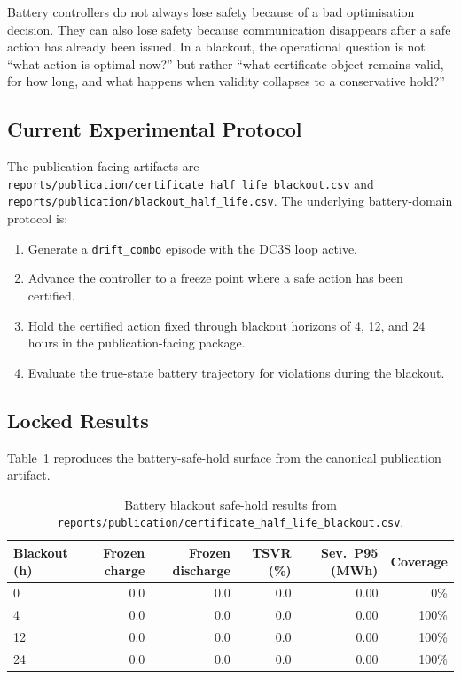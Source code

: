 Battery controllers do not always lose safety because of a bad optimisation
decision.  They can also lose safety because communication disappears after a
safe action has already been issued.  In a blackout, the operational question
is not ``what action is optimal now?'' but rather ``what certificate object
remains valid, for how long, and what happens when validity collapses to a
conservative hold?''

\subsection{Current Experimental Protocol}

The publication-facing artifacts are
\texttt{reports/publication/certificate\_half\_life\_blackout.csv} and
\texttt{reports/publication/blackout\_half\_life.csv}.  The underlying
battery-domain protocol is:

\begin{enumerate}
  \item Generate a \texttt{drift\_combo} episode with the DC3S loop active.
  \item Advance the controller to a freeze point where a safe action has been
    certified.
  \item Hold the certified action fixed through blackout horizons of
    4, 12, and 24 hours in the publication-facing package.
  \item Evaluate the true-state battery trajectory for violations during the
    blackout.
\end{enumerate}

\subsection{Locked Results}

Table~\ref{tab:blackout-study} reproduces the battery-safe-hold surface from
the canonical publication artifact.

\begin{table}[ht]
\centering
\caption{Battery blackout safe-hold results from
  \texttt{reports/publication/certificate\_half\_life\_blackout.csv}.}
\label{tab:blackout-study}
\begin{tabular}{lrrrrr}
\toprule
\textbf{Blackout (h)} & \textbf{Frozen charge} & \textbf{Frozen discharge} &
  \textbf{TSVR (\%)} & \textbf{Sev.\ P95 (MWh)} & \textbf{Coverage} \\
\midrule
  0  & 0.0 & 0.0 & 0.0 & 0.00 &   0\% \\
  4  & 0.0 & 0.0 & 0.0 & 0.00 & 100\% \\
 12  & 0.0 & 0.0 & 0.0 & 0.00 & 100\% \\
 24  & 0.0 & 0.0 & 0.0 & 0.00 & 100\% \\
\bottomrule
\end{tabular}
\end{table}

